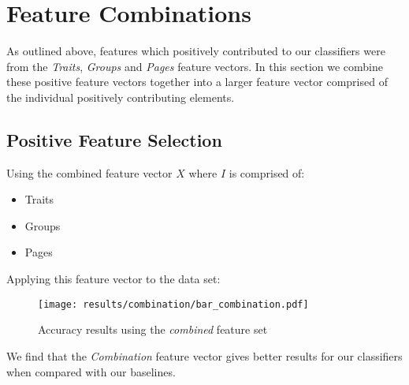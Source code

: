 
\chapter{Feature Combinations}
\label{cha:bma}

As outlined above, features which positively contributed to our classifiers were from the \emph{Traits}, \emph{Groups} and \emph{Pages} feature 
vectors. In this section we combine these positive feature vectors together into a larger feature vector comprised of the individual 
positively contributing elements.

\section{Positive Feature Selection}
\label{sec:notation}

Using the combined feature vector $X$ where $I$ is comprised of:
\begin{itemize}
\item Traits
\item Groups
\item Pages
\end{itemize}

Applying this feature vector to the data set:

\begin{figure}[h]
	\begin{center}
		\texttt{[image: results/combination/bar\_combination.pdf]}
		\caption{Accuracy results using the \emph{combined} feature set}
	\end{center}
\end{figure}

We find that the \emph{Combination} feature vector gives better results for our classifiers when compared with our baselines.

